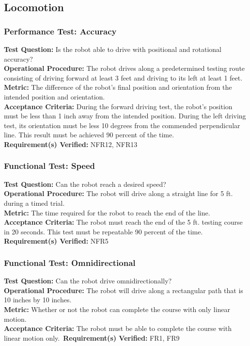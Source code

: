 
\subsection{Locomotion}
\label{sec:verification_locomotion}

\subsubsection{Performance Test: Accuracy}
\label{test:locomotion_pt_accuracy}
\textbf{Test Question:} Is the robot able to drive with positional and rotational accuracy?\\
\textbf{Operational Procedure:} The robot drives along a predetermined testing route consisting of driving forward at least 3 feet and driving to its left at least 1 feet.\\
\textbf{Metric:} The difference of the robot's final position and orientation from the intended position and orientation. \\
\textbf{Acceptance Criteria:} During the forward driving test, the robot's position must be less than 1 inch away from the intended position. During the left driving test, its orientation must be less 10 degrees from the commended perpendicular line. This result must be achieved 90 percent of the time.\\
\textbf{Requirement(s) Verified:} NFR12, NFR13

\subsubsection{Functional Test: Speed}
\label{test:locomotion_ft_speed}
\textbf{Test Question:} Can the robot reach a desired speed? \\
\textbf{Operational Procedure:} The robot will drive along a straight line for 5 ft. during a timed trial.\\
\textbf{Metric:} The time required for the robot to reach the end of the line.\\
\textbf{Acceptance Criteria:} The robot must reach the end of the 5 ft. testing course in 20 seconds. This test must be repeatable 90 percent of the time. \\
\textbf{Requirement(s) Verified:} NFR5

\subsubsection{Functional Test: Omnidirectional}
\label{test:locomotion_ft_omni}
\textbf{Test Question:} Can the robot drive omnidirectionally? \\
\textbf{Operational Procedure:} The robot will drive along a rectangular path that is 10 inches by 10 inches.\\
\textbf{Metric:} Whether or not the robot can complete the course with only linear motion.\\
\textbf{Acceptance Criteria:} The robot must be able to complete the course with linear motion only.\
\textbf{Requirement(s) Verified:} FR1, FR9 \\